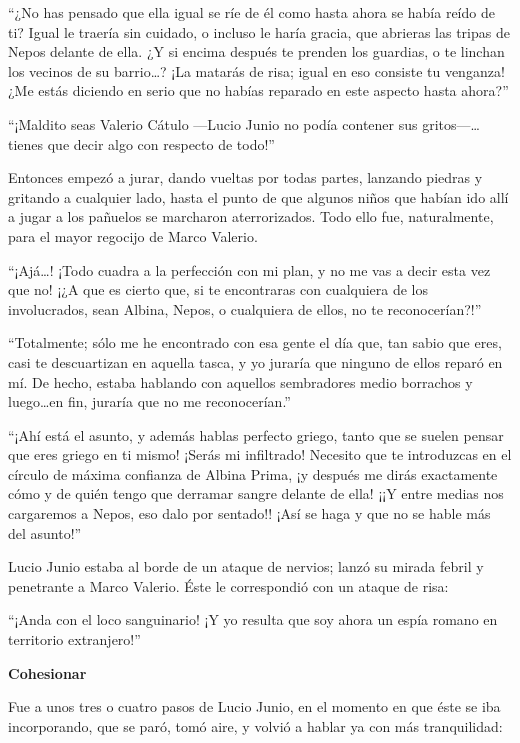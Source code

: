 \documentclass[11pt,openany]{book}
\begin{document}
“¿No has pensado que ella igual se ríe de él como hasta ahora se había reído de ti? Igual le traería sin cuidado, o incluso le haría gracia, que abrieras las tripas de Nepos delante de ella. ¿Y si encima después te prenden los guardias, o te linchan los vecinos de su barrio\dots? ¡La matarás de risa; igual en eso consiste tu venganza! ¿Me estás diciendo en serio que no habías reparado en este aspecto hasta ahora?” 

“¡Maldito seas Valerio Cátulo —Lucio Junio no podía contener sus gritos—\dots tienes que decir algo con respecto de todo!” 

Entonces empezó a jurar, dando vueltas por todas partes, lanzando piedras y gritando a cualquier lado, hasta el punto de que algunos niños que habían ido allí a jugar a los pañuelos se marcharon aterrorizados. Todo ello fue, naturalmente, para el mayor regocijo de Marco Valerio. 

“¡Ajá\dots! ¡Todo cuadra a la perfección con mi plan, y no me vas a decir esta vez que no! ¡¿A que es cierto que, si te encontraras con cualquiera de los involucrados, sean Albina, Nepos, o cualquiera de ellos, no te reconocerían?!” 

“Totalmente; sólo me he encontrado con esa gente el día que, tan sabio que eres, casi te descuartizan en aquella tasca, y yo juraría que ninguno de ellos reparó en mí. De hecho, estaba hablando con aquellos sembradores medio borrachos y luego\dots en fin, juraría que no me reconocerían.” 

“¡Ahí está el asunto, y además hablas perfecto griego, tanto que se suelen pensar que eres griego en ti mismo! ¡Serás mi infiltrado! Necesito que te introduzcas en el círculo de máxima confianza de Albina Prima, ¡y después me dirás exactamente cómo y de quién tengo que derramar sangre delante de ella! ¡¡Y entre medias nos cargaremos a Nepos, eso dalo por sentado!! ¡Así se haga y que no se hable más del asunto!” 

Lucio Junio estaba al borde de un ataque de nervios; lanzó su mirada febril y penetrante a Marco Valerio. Éste le correspondió con un ataque de risa: 

“¡Anda con el loco sanguinario! ¡Y yo resulta que soy ahora un espía romano en territorio extranjero!” 

\textbf{Cohesionar}

Fue a unos tres o cuatro pasos de Lucio Junio, en el momento en que éste se iba incorporando, que se paró, tomó aire, y volvió a hablar ya con más tranquilidad: 
\end{document}
